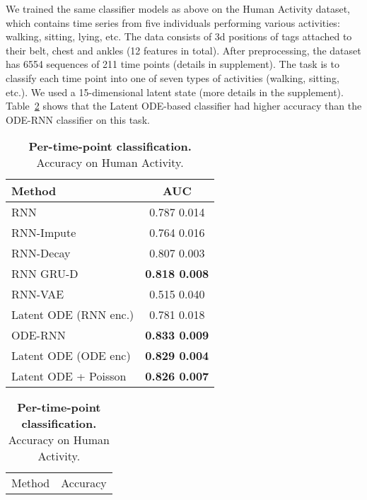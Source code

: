 \documentclass{article}
\begin{document}
We trained the same classifier models as above on the Human Activity dataset, which contains time series from five individuals performing various activities: walking, sitting, lying, etc.
The data consists of 3d positions of tags attached to their belt, chest and ankles (12 features in total).
After preprocessing, the dataset has 6554 sequences of 211 time points (details in supplement).
The task is to classify each time point into one of seven types of activities (walking, sitting, etc.).
We used a 15-dimensional latent state (more details in the supplement).
Table~\ref{tab:human_activity_classif} shows that the Latent ODE-based classifier had higher accuracy than the ODE-RNN classifier on this task.



\begin{table}
    \vspace{-4mm}
    \parbox{0.45\linewidth}{
    	\centering
    	\captionsetup{justification=centering}
        \caption{\textbf{Per-sequence classification.}\\ AUC on Physionet.}
    	\label{tab:phys_classif}
        \begin{tabular}{@{}lc@{}}
        \toprule
        Method & AUC\\
        \midrule
        RNN  & 0.787  0.014  \\
        RNN-Impute & 0.764  0.016\\
        RNN-Decay & 0.807  0.003  \\
        RNN GRU-D & \textbf{0.818  0.008}  \\
RNN-VAE & 0.515  0.040\\
        Latent ODE (RNN enc.) & 0.781  0.018 \\
        \addlinespace[2pt]
        \hdashline
        \addlinespace[2pt]
        ODE-RNN & \textbf{0.833  0.009} \\
        Latent ODE (ODE enc) & \textbf{0.829  0.004}\\
        Latent ODE + Poisson & \textbf{0.826  0.007}\\
        \bottomrule
        \end{tabular}
  }
    \hfill
    \parbox{0.45\linewidth}{ 
    	\centering
    	\captionsetup{justification=centering}
        \caption{\textbf{Per-time-point classification.}\\ Accuracy on Human Activity.}
    	\label{tab:human_activity_classif}
        \begin{tabular}{@{}lc@{}}
        \toprule
        Method &  Accuracy\\

\end{tabular}}
\end{table}
\end{document}
